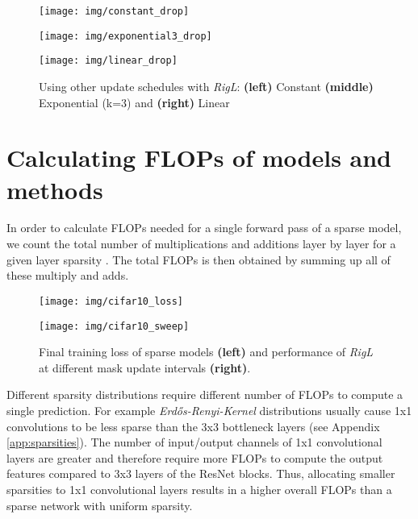 \documentclass{article}
\begin{document}
\begin{figure*}
\centering
\begin{minipage}{.33\textwidth}
  \centering
  \texttt{[image: img/constant\_drop]}
\end{minipage}\begin{minipage}{.33\textwidth}
  \centering
  \texttt{[image: img/exponential3\_drop]}
\end{minipage}
\begin{minipage}{.33\textwidth}
  \centering
  \texttt{[image: img/linear\_drop]}
\end{minipage}
\caption{Using other update schedules with {\em RigL}: \textbf{(left)} Constant \textbf{(middle)} Exponential (k=3) and \textbf{(right)} Linear }
\label{fig:app:schedules_other}
\end{figure*}

\section{Calculating FLOPs of models and methods}
\label{app:flops}
In order to calculate FLOPs needed for a single forward pass of a sparse model, we count the total number of multiplications and additions layer by layer for a given layer sparsity . The total FLOPs is then obtained by summing up all of these multiply and adds.
\begin{figure*}[b!]
\centering
\begin{minipage}{.5\textwidth}
  \centering
  \texttt{[image: img/cifar10\_loss]}
\end{minipage}\begin{minipage}{.5\textwidth}
  \centering
  \texttt{[image: img/cifar10\_sweep]}
\end{minipage}
\caption{Final training loss of sparse models \textbf{(left)} and performance of {\em RigL} at different mask update intervals \textbf{(right)}.}
\label{fig:app:cifar10}
\end{figure*}
Different sparsity distributions require different number of FLOPs to compute a single prediction. For example \textit{Erdős-Renyi-Kernel} distributions usually cause 1x1 convolutions to be less sparse than the 3x3 bottleneck layers (see Appendix \ref{app:sparsities}). The number of input/output channels of 1x1 convolutional layers are greater and therefore require more FLOPs to compute the output features compared to 3x3 layers of the ResNet blocks. Thus, allocating smaller sparsities to 1x1 convolutional layers results in a higher overall FLOPs than a sparse network with uniform sparsity.
\end{document}
